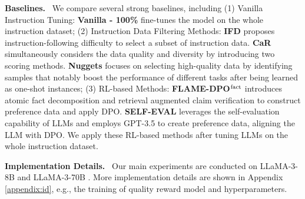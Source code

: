 \noindent
\textbf{Baselines.}
\
We compare several strong baselines, including (1) Vanilla Instruction Tuning: \textbf{Vanilla - 100\%} fine-tunes the model on the whole instruction dataset; 
(2) Instruction Data Filtering Methods: 
\textbf{IFD} \citep{li-etal-2024-quantity} proposes instruction-following difficulty to select a subset of instruction data.
\textbf{CaR} \citep{ge2024clustering} simultaneously considers the data quality and diversity by introducing two scoring methods.
\textbf{Nuggets} \citep{li2024shot}
focuses on selecting high-quality data by identifying samples that notably boost the performance of different tasks after being learned as one-shot instances;
(3) RL-based Methods: \textbf{FLAME-DPO$^{\rm fact}$} \citep{lin2024flame} introduces atomic fact decomposition and retrieval augmented claim verification to construct preference data and apply DPO.
\textbf{SELF-EVAL} \citep{zhang-etal-2024-self} leverages the self-evaluation capability of LLMs and employs GPT-3.5 to create preference data, aligning the LLM with DPO.
We apply these RL-based methods after tuning LLMs on the whole instruction dataset.

\noindent
\textbf{Implementation Details.}
\
Our main experiments are conducted on LLaMA-3-8B and LLaMA-3-70B \citep{llama3}.
More implementation details are shown in Appendix \ref{appendix:id}, e.g., the training of quality reward model and hyperparameters.


